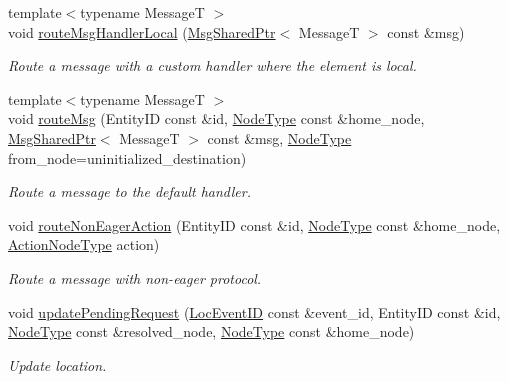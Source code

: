 \begin{DoxyCompactItemize}
{\footnotesize template$<$typename MessageT $>$ }\\void \hyperlink{structvt_1_1location_1_1_entity_location_coord_a67ece532f25a055200383a3a2730085a}{route\+Msg\+Handler\+Local} (\hyperlink{namespacevt_ab2b3d506ec8e8d1540aede826d84a239}{Msg\+Shared\+Ptr}$<$ MessageT $>$ const \&msg)
\begin{DoxyCompactList}\small\item\em Route a message with a custom handler where the element is local. \end{DoxyCompactList}\item 
{\footnotesize template$<$typename MessageT $>$ }\\void \hyperlink{structvt_1_1location_1_1_entity_location_coord_ab7b80f1093a4360a1920fc21bc32c76a}{route\+Msg} (Entity\+ID const \&id, \hyperlink{namespacevt_a866da9d0efc19c0a1ce79e9e492f47e2}{Node\+Type} const \&home\+\_\+node, \hyperlink{namespacevt_ab2b3d506ec8e8d1540aede826d84a239}{Msg\+Shared\+Ptr}$<$ MessageT $>$ const \&msg, \hyperlink{namespacevt_a866da9d0efc19c0a1ce79e9e492f47e2}{Node\+Type} from\+\_\+node=uninitialized\+\_\+destination)
\begin{DoxyCompactList}\small\item\em Route a message to the default handler. \end{DoxyCompactList}\item 
void \hyperlink{structvt_1_1location_1_1_entity_location_coord_ae7c1ec3412f2a16ea3f40d6bb39f23ca}{route\+Non\+Eager\+Action} (Entity\+ID const \&id, \hyperlink{namespacevt_a866da9d0efc19c0a1ce79e9e492f47e2}{Node\+Type} const \&home\+\_\+node, \hyperlink{namespacevt_a0436cb2d620dcbb21b5b49cd9c9c4749}{Action\+Node\+Type} action)
\begin{DoxyCompactList}\small\item\em Route a message with non-\/eager protocol. \end{DoxyCompactList}\item 
void \hyperlink{structvt_1_1location_1_1_entity_location_coord_a96e4c5c2a943450554b17c34f05995d0}{update\+Pending\+Request} (\hyperlink{namespacevt_1_1location_aa5ccc1a42aa22b0b41fcfbbdee314dca}{Loc\+Event\+ID} const \&event\+\_\+id, Entity\+ID const \&id, \hyperlink{namespacevt_a866da9d0efc19c0a1ce79e9e492f47e2}{Node\+Type} const \&resolved\+\_\+node, \hyperlink{namespacevt_a866da9d0efc19c0a1ce79e9e492f47e2}{Node\+Type} const \&home\+\_\+node)
\begin{DoxyCompactList}\small\item\em Update location. \end{DoxyCompactList}\item 

\end{DoxyCompactItemize}
